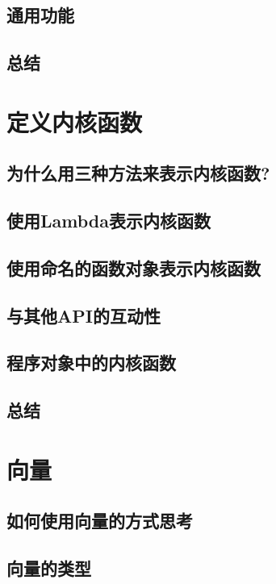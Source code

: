 \documentclass[11pt,a4paper,UTF8]{ctexart}
\begin{document}
		\subsection{通用功能}
		
		\subsection{总结}
		
	\section{定义内核函数}
	
		\subsection{为什么用三种方法来表示内核函数?}
		
		\subsection{使用Lambda表示内核函数}
		
		\subsection{使用命名的函数对象表示内核函数}
		
		\subsection{与其他API的互动性}
		
		\subsection{程序对象中的内核函数}
		
		\subsection{总结}
		
	\section{向量}
	
		\subsection{如何使用向量的方式思考}
		
		\subsection{向量的类型}
		
\end{document}
